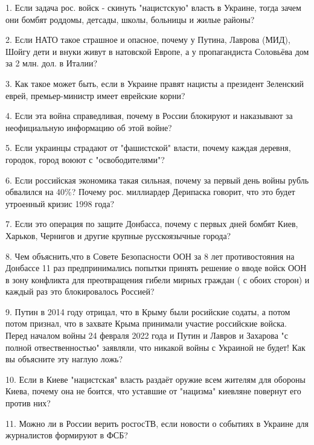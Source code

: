  
 
 
 
 

1. Если задача рос. войск - скинуть "нацистскую" власть в Украине, тогда зачем
они бомбят роддомы, детсады, школы, больницы и жилые районы?

2. Если НАТО такое страшное и опасное, почему у Путина, Лаврова (МИД), Шойгу
дети и внуки живут в натовской Европе, а у пропагандиста Соловьёва дом за 2
млн. дол. в Италии?

3. Как такое может быть, если в Украине правят нацисты а президент  Зеленский
еврей, премьер-министр имеет еврейские корни?

4. Если эта война справедливая, почему в России блокируют и наказывают за
неофициальную информацию об этой войне?

5. Если украинцы страдают от "фашистской" власти, почему каждая деревня,
городок, город воюют с "освободителями"?

6. Если российская экономика такая сильная, почему за первый день войны рубль
обвалился на 40\%? Почему рос. миллиардер Дерипаска говорит, что это будет
утроенный кризис 1998 года?

7. Если это операция по защите Донбасса, почему с первых дней бомбят Киев,
Харьков, Чернигов и другие крупные русскоязычные города?

8. Чем объяснить,что в Совете Безопасности ООН за 8 лет противостояния на
Донбассе 11 раз предпринимались попытки принять решение о вводе войск ООН в
зону конфликта для преотвращения гибели мирных граждан ( с обоих сторон) и
каждый раз это блокировалось Россией?

9. Путин  в 2014 году отрицал, что в Крыму были росийские содаты, а потом потом
признал, что в захвате Крыма принимали участие российские войска. Перед началом
войны 24 февраля 2022 года и Путин и Лавров и Захарова "с полной
отвественностью" заявляли, что никакой войны с Украиной не будет! Как вы
объясните эту наглую ложь?

10. Если в Киеве "нацистская" власть раздаёт оружие  всем жителям для обороны
Киева, почему она не боится, что уставшие от "нацизма" киевляне повернут его
против них?

11. Можно ли в России верить росгосТВ, если новости о событиях в Украине для
журналистов формируют в ФСБ?


